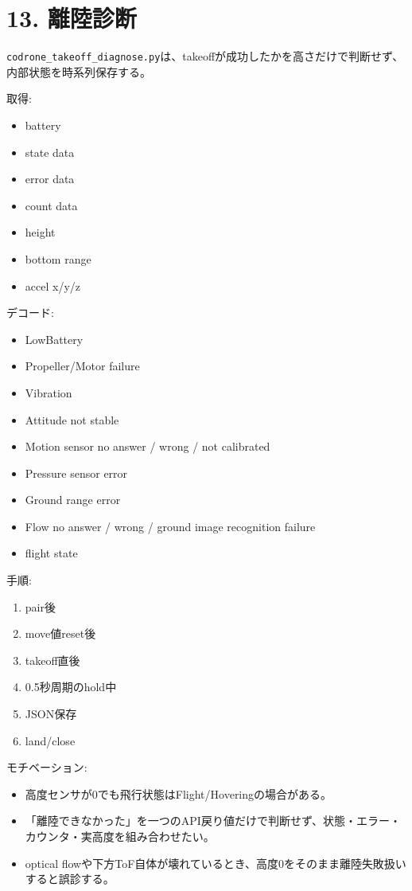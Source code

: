 \documentclass[10pt,a4paper,openany]{ltjsbook}
\begin{document}
\chapter{13. 離陸診断}
\texttt{codrone\_takeoff\_diagnose.py}は、takeoffが成功したかを高さだけで判断せず、内部状態を時系列保存する。\par
取得:\par
\begin{itemize}
\item battery
\item state data
\item error data
\item count data
\item height
\item bottom range
\item accel x/y/z
\end{itemize}
デコード:\par
\begin{itemize}
\item LowBattery
\item Propeller/Motor failure
\item Vibration
\item Attitude not stable
\item Motion sensor no answer / wrong / not calibrated
\item Pressure sensor error
\item Ground range error
\item Flow no answer / wrong / ground image recognition failure
\item flight state
\end{itemize}
手順:\par
\begin{enumerate}
\item pair後
\item move値reset後
\item takeoff直後
\item 0.5秒周期のhold中
\item JSON保存
\item land/close
\end{enumerate}
モチベーション:\par
\begin{itemize}
\item 高度センサが0でも飛行状態はFlight/Hoveringの場合がある。
\item 「離陸できなかった」を一つのAPI戻り値だけで判断せず、状態・エラー・カウンタ・実高度を組み合わせたい。
\item optical flowや下方ToF自体が壊れているとき、高度0をそのまま離陸失敗扱いすると誤診する。
\end{itemize}
\vspace{0.3em}{\noindent\color{ReportLight}\rule{\linewidth}{0.8pt}}\vspace{0.3em}
\end{document}
